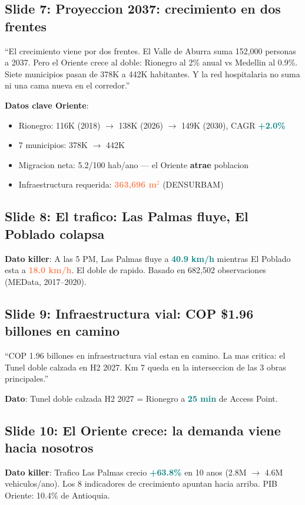 \documentclass[10pt, a4paper]{article}
\newcommand{\hl}[1]{\textcolor{teal}{\textbf{#1}}}
\newcommand{\dg}[1]{\textcolor{coral}{\textbf{#1}}}
\newcommand{\slide}[2]{\subsection{Slide #1: #2}}
\begin{document}
\slide{7}{Proyeccion 2037: crecimiento en dos frentes}
\begin{tip}
``El crecimiento viene por dos frentes. El Valle de Aburra suma 152,000 personas a 2037. Pero el Oriente crece al doble: Rionegro al 2\% anual vs Medellin al 0.9\%. Siete municipios pasan de 378K a 442K habitantes. Y la red hospitalaria no suma ni una cama nueva en el corredor.''
\end{tip}
\textbf{Datos clave Oriente}:
\begin{itemize}[nosep]
  \item Rionegro: 116K (2018) $\to$ 138K (2026) $\to$ 149K (2030), CAGR \hl{+2.0\%}
  \item 7 municipios: 378K $\to$ 442K
  \item Migracion neta: 5.2/100 hab/ano --- el Oriente \textbf{atrae} poblacion
  \item Infraestructura requerida: \dg{363,696 m$^2$} (DENSURBAM)
\end{itemize}

\slide{8}{El trafico: Las Palmas fluye, El Poblado colapsa}
\textbf{Dato killer}: A las 5 PM, Las Palmas fluye a \hl{40.9 km/h} mientras El Poblado esta a \dg{18.0 km/h}. El doble de rapido. Basado en 682,502 observaciones (MEData, 2017--2020).

\slide{9}{Infraestructura vial: COP \$1.96 billones en camino}
\begin{tip}
``COP 1.96 billones en infraestructura vial estan en camino. La mas critica: el Tunel doble calzada en H2 2027. Km 7 queda en la interseccion de las 3 obras principales.''
\end{tip}
\textbf{Dato}: Tunel doble calzada H2 2027 = Rionegro a \hl{25 min} de Access Point.

\slide{10}{El Oriente crece: la demanda viene hacia nosotros}
\textbf{Dato killer}: Trafico Las Palmas crecio \hl{+63.8\%} en 10 anos (2.8M $\to$ 4.6M vehiculos/ano). Los 8 indicadores de crecimiento apuntan hacia arriba. PIB Oriente: 10.4\% de Antioquia.
\end{document}
